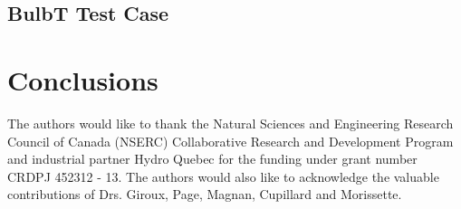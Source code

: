 \documentclass[twocolumn,10pt]{asme2ej}
\begin{document}
\subsection{BulbT Test Case}

\section{Conclusions}


\begin{acknowledgment}
The authors would like to thank the Natural Sciences and Engineering Research Council of Canada (NSERC) Collaborative Research and Development Program and industrial partner Hydro Quebec for the funding under grant number CRDPJ 452312 - 13. The authors would also like to acknowledge the valuable contributions of Drs. Giroux, Page, Magnan, Cupillard and Morissette.
\end{acknowledgment}
\FloatBarrier
%




%
\end{document}
